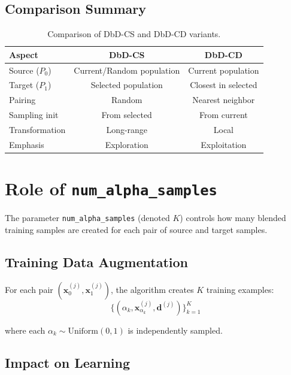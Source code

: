 \documentclass[11pt,a4paper]{article}
\newcommand{\vx}{\mathbf{x}}
\begin{document}
\subsection{Comparison Summary}

\begin{table}[h]
\centering
\begin{tabular}{@{}lcc@{}}
\toprule
\textbf{Aspect} & \textbf{DbD-CS} & \textbf{DbD-CD} \\
\midrule
Source ($P_0$) & Current/Random population & Current population \\
Target ($P_1$) & Selected population & Closest in selected \\
Pairing & Random & Nearest neighbor \\
Sampling init & From selected & From current \\
Transformation & Long-range & Local \\
Emphasis & Exploration & Exploitation \\
\bottomrule
\end{tabular}
\caption{Comparison of DbD-CS and DbD-CD variants.}
\label{tab:variants}
\end{table}

\section{Role of \texttt{num\_alpha\_samples}}

The parameter \texttt{num\_alpha\_samples} (denoted $K$) controls how many blended training samples are created for each pair of source and target samples.

\subsection{Training Data Augmentation}

For each pair $(\vx_0^{(j)}, \vx_1^{(j)})$, the algorithm creates $K$ training examples:
\begin{equation}
    \{(\alpha_k, \vx_{\alpha_k}^{(j)}, \mathbf{d}^{(j)})\}_{k=1}^{K}
\end{equation}

where each $\alpha_k \sim \text{Uniform}(0, 1)$ is independently sampled.

\subsection{Impact on Learning}
\end{document}
